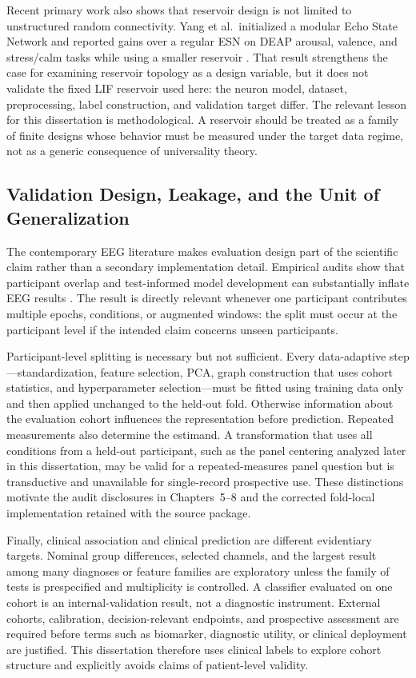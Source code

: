 Recent primary work also shows that reservoir design is not limited to unstructured random connectivity. Yang et al.\ initialized a modular Echo State Network and reported gains over a regular ESN on DEAP arousal, valence, and stress/calm tasks while using a smaller reservoir \cite{yang_modular_esn_2024}. That result strengthens the case for examining reservoir topology as a design variable, but it does not validate the fixed LIF reservoir used here: the neuron model, dataset, preprocessing, label construction, and validation target differ. The relevant lesson for this dissertation is methodological. A reservoir should be treated as a family of finite designs whose behavior must be measured under the target data regime, not as a generic consequence of universality theory.

\subsection{Validation Design, Leakage, and the Unit of Generalization}
The contemporary EEG literature makes evaluation design part of the scientific claim rather than a secondary implementation detail. Empirical audits show that participant overlap and test-informed model development can substantially inflate EEG results \cite{lee_eeg_leakage_2023,brookshire_eeg_leakage_2024,kinahan_eeg_reproducibility_2024}. The result is directly relevant whenever one participant contributes multiple epochs, conditions, or augmented windows: the split must occur at the participant level if the intended claim concerns unseen participants.

Participant-level splitting is necessary but not sufficient. Every data-adaptive step---standardization, feature selection, PCA, graph construction that uses cohort statistics, and hyperparameter selection---must be fitted using training data only and then applied unchanged to the held-out fold. Otherwise information about the evaluation cohort influences the representation before prediction. Repeated measurements also determine the estimand. A transformation that uses all conditions from a held-out participant, such as the panel centering analyzed later in this dissertation, may be valid for a repeated-measures panel question but is transductive and unavailable for single-record prospective use. These distinctions motivate the audit disclosures in Chapters~5--8 and the corrected fold-local implementation retained with the source package.

Finally, clinical association and clinical prediction are different evidentiary targets. Nominal group differences, selected channels, and the largest result among many diagnoses or feature families are exploratory unless the family of tests is prespecified and multiplicity is controlled. A classifier evaluated on one cohort is an internal-validation result, not a diagnostic instrument. External cohorts, calibration, decision-relevant endpoints, and prospective assessment are required before terms such as biomarker, diagnostic utility, or clinical deployment are justified. This dissertation therefore uses clinical labels to explore cohort structure and explicitly avoids claims of patient-level validity.

